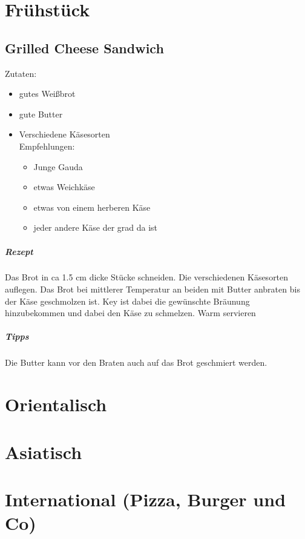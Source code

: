 \documentclass[11pt,twoside,a4paper]{book}
\begin{document}
\tableofcontents


\chapter{Frühstück}
\section{Grilled Cheese Sandwich}
Zutaten:
	\begin{itemize}
		\item gutes Weißbrot
		\item gute Butter
		\item Verschiedene Käsesorten\\
		Empfehlungen:
		\begin{itemize}
			\item Junge Gauda
			\item etwas Weichkäse
			\item etwas von einem herberen Käse
			\item jeder andere Käse der grad da ist
		\end {itemize}
	\end{itemize}
\paragraph{Rezept}
Das Brot in ca 1.5 cm dicke Stücke schneiden.
Die verschiedenen Käsesorten auflegen.
Das Brot bei mittlerer Temperatur an beiden mit Butter anbraten bis der Käse geschmolzen ist.
Key ist dabei die gewünschte Bräunung hinzubekommen und dabei den Käse zu schmelzen.
Warm servieren
\paragraph{Tipps}
Die Butter kann vor den Braten auch auf das Brot geschmiert werden.
\chapter{Orientalisch}

\chapter{Asiatisch}

\chapter{International (Pizza, Burger und Co)}
\end{document}
